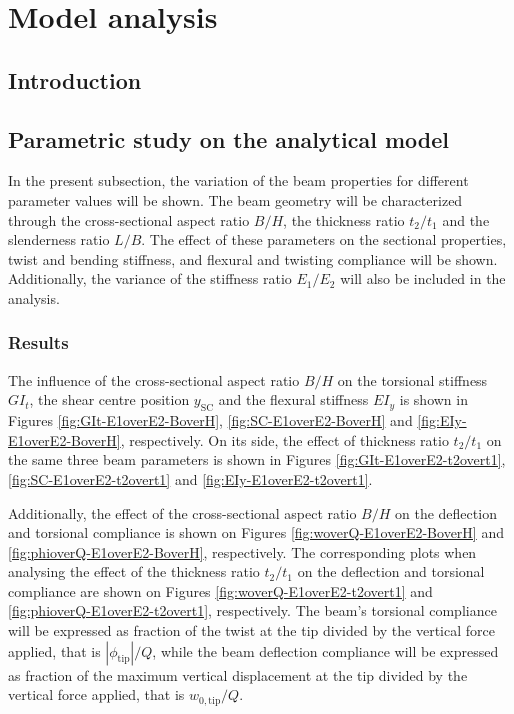\chapter{Model analysis} \label{chap:Results_model}


\section{Introduction} \label{sec:intro_Results_sim}

\section{Parametric study on the analytical model} \label{sec:analyticalParametricStudy_Results_sim} 
In the present subsection, the variation of the beam properties for different parameter values will be shown. The beam geometry will be characterized through the cross-sectional aspect ratio $B/H$, the thickness ratio $t_2/t_1$ and the slenderness ratio $L/B$. The effect of these parameters on the sectional properties, twist and bending stiffness, and flexural and twisting compliance will be shown. Additionally, the variance of the stiffness ratio $E_1/E_2$ will also be included in the analysis.

\subsection{Results} \label{subsec:results_parametricStudy}

The influence of the cross-sectional aspect ratio $B/H$ on the torsional stiffness $G I_t$, the shear centre position $y_{\mathrm{SC}}$ and the flexural stiffness $E I_y$ is shown in Figures \ref{fig:GIt-E1overE2-BoverH}, \ref{fig:SC-E1overE2-BoverH} and \ref{fig:EIy-E1overE2-BoverH}, respectively. On its side, the effect of thickness ratio $t_2/t_1$ on the same three beam parameters is shown in Figures \ref{fig:GIt-E1overE2-t2overt1}, \ref{fig:SC-E1overE2-t2overt1} and \ref{fig:EIy-E1overE2-t2overt1}.

Additionally, the effect of the cross-sectional aspect ratio $B/H$ on the deflection and torsional compliance is shown on Figures \ref{fig:woverQ-E1overE2-BoverH} and \ref{fig:phioverQ-E1overE2-BoverH}, respectively. The corresponding plots when analysing the effect of the thickness ratio $t_2/t_1$ on the deflection and torsional compliance are shown on Figures \ref{fig:woverQ-E1overE2-t2overt1} and \ref{fig:phioverQ-E1overE2-t2overt1}, respectively. The beam's torsional compliance will be expressed as fraction of the twist at the tip divided by the vertical force applied, that is $|\phi_{\mathrm{tip}}| / Q$, while the beam deflection compliance will be expressed as fraction of the maximum vertical displacement at the tip divided by the vertical force applied, that is $w_{\mathrm{0,tip}} / Q$.

